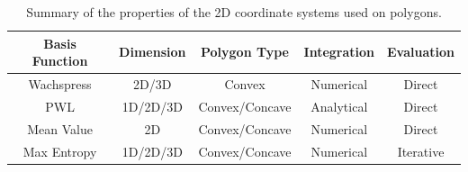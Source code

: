 \begin{table}
\centering
\caption[Summary of the 2D polygonal basis functions]{Summary of the properties of the 2D coordinate systems used on polygons. }
\begin{tabular}{|c|c|c|c|c|}
\hline
Basis Function & Dimension & Polygon Type & Integration & Evaluation \\
\hline \hline
Wachspress	&2D/3D&	Convex&	Numerical	&Direct\\ \hline
PWL&	1D/2D/3D&	Convex/Concave&	Analytical	&Direct\\ \hline
Mean Value&	2D&	Convex/Concave&	Numerical	&Direct\\ \hline
Max Entropy&	1D/2D/3D	&Convex/Concave&	Numerical&	Iterative\\ \hline
\end{tabular}
\label{tab::BF_2Dlin_summary}
\end{table}

